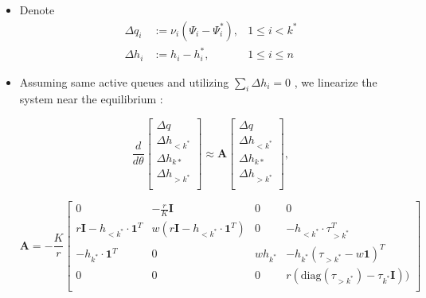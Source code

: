 \documentclass[10pt]{beamer}
\begin{document}
\begin{frame}

\begin{itemize}

\item Denote 
\begin{align*}
\Delta q_i &:= \nu_i(\Psi_i - \Psi_i^*) , & 1 \leq i < k^* \\
\Delta h_i &:= h_i - h^*_i, & 1 \leq i \leq n
\end{align*}

\item Assuming same active queues and utilizing $ \sum_{i} \Delta h_i = 0 $  , we linearize the system near the equilibrium :


$$ \frac{d}{d \theta} \begin{bmatrix} \Delta q \\ \Delta h_{< k^*} \\ \Delta h_{k*} \\ \Delta h_{> k^*} \\ \end{bmatrix} \approx \bm{A}
 \begin{bmatrix} \Delta q \\ \Delta h_{< k^*}  \\ \Delta h_{k*} \\ \Delta h_{> k^*} \\ \end{bmatrix} ,$$
 
 $$ \bm{A}  =  -\frac{K}{r} \begin{bmatrix}
 		 0 & -\frac{r}{K} \mathbf{I} & 0 & 0 \\
 		 r \bm{I} - h_{< k^*} \cdot \bm{1}^T  & w ( r\bm{I} - h_{<k^*} \cdot \bm{1}^T ) & 0 & - h_{< k^*} \cdot \tau_{>k^*}^T  \\
 		- h_{k^*} \cdot \bm{1}^T & 0 &  w h_{k^*} & - h_{k^*} (\tau_{>k^*} - w \bm{1})^T \\
 		 0 & 0 & 0 & r (\mathrm{diag}(\tau_{>k^*}) - \tau_{k^*} \bm{I}) )  \\
 		 
  \end{bmatrix} $$


\end{itemize}

\end{frame}
\end{document}
